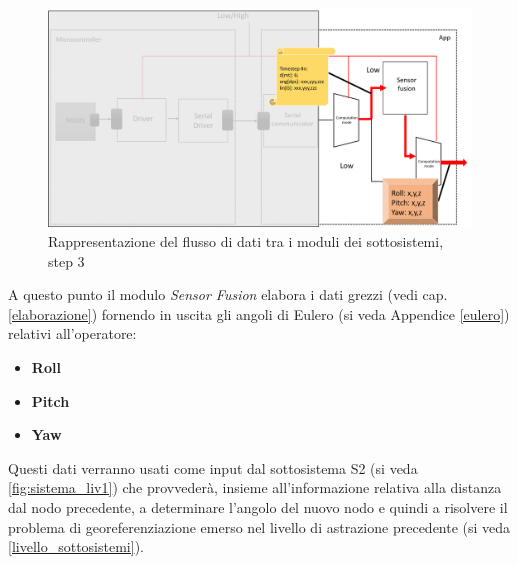  \begin{figure}[H]  
 	\centering 
 	\includegraphics[scale=0.25 ]{DescrizioneDelSistema/flusso3.png}
 	\caption{Rappresentazione del flusso di dati tra i moduli dei sottosistemi, step 3}
 	\label{fig:flusso3}
 \end{figure}
\newpage
A questo punto il modulo \textit{Sensor Fusion} elabora i dati grezzi (vedi cap.\ref{elaborazione}) fornendo in uscita gli angoli di Eulero (si veda Appendice \ref{eulero}) relativi all'operatore:
\begin{itemize}
	\item \textbf{Roll}
	\item \textbf{Pitch}
	\item \textbf{Yaw} 
\end{itemize}
Questi dati verranno usati come input dal sottosistema S2 (si veda \ref{fig:sistema_liv1}) che provvederà, insieme all'informazione relativa alla distanza dal nodo precedente, a determinare l'angolo del nuovo nodo e quindi a risolvere il problema di georeferenziazione emerso nel livello di astrazione precedente (si veda \ref{livello_sottosistemi}).
